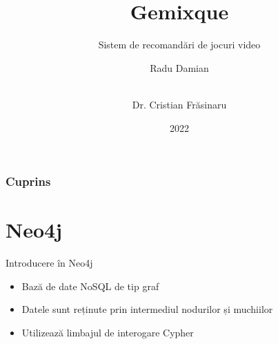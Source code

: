 \documentclass{beamer}
\title[Gemixque - sistem de recomandări de jocuri video]{Gemixque}
\subtitle{Sistem de recomandări de jocuri video}
\author[Radu Damian]{Radu Damian \and \\[9mm] Dr. Cristian Frăsinaru}
\institute{Facultatea de Informatică}
\date{2022}
\begin{document}
\frame{\titlepage}


\begin{frame}
  \frametitle{Cuprins}
  \tableofcontents
\end{frame}


\section{Neo4j}
\frame{\tableofcontents[currentsection]}
\begin{frame}{Introducere în Neo4j}
    \begin{itemize}
        \item Bază de date NoSQL de tip graf
        \item Datele sunt reținute prin intermediul nodurilor și muchiilor
        \item Utilizează limbajul de interogare Cypher
    \end{itemize}
\end{frame}

\end{document}
